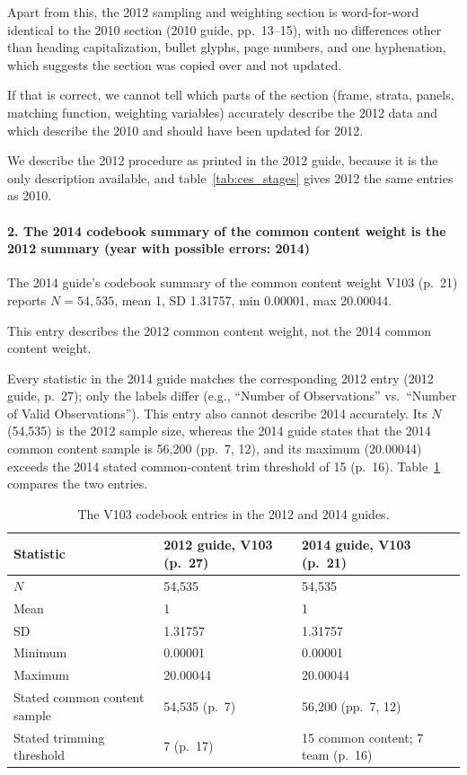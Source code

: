 \documentclass[12pt]{article}
\begin{document}

Apart from this, the 2012 sampling and weighting section is word-for-word identical to the 2010 section (2010 guide, pp.~13--15), with no differences other than heading capitalization, bullet glyphs, page numbers, and one hyphenation, which suggests the section was copied over and not updated.

If that is correct, we cannot tell which parts of the section (frame, strata, panels, matching function, weighting variables) accurately describe the 2012 data and which describe the 2010 and should have been updated for 2012.

We describe the 2012 procedure as printed in the 2012 guide, because it is the only description available, and table~\ref{tab:ces_stages} gives 2012 the same entries as 2010.

\paragraph*{2. The 2014 codebook summary of the common content weight is the 2012 summary (year with possible errors: 2014)}
The 2014 guide's codebook summary of the common content weight V103 (p.~21) reports $N = 54{,}535$, mean 1, SD 1.31757, min 0.00001, max 20.00044.

This entry describes the 2012 common content weight, not the 2014 common content weight.

Every statistic in the 2014 guide matches the corresponding 2012 entry (2012 guide, p.~27); only the labels differ (e.g., ``Number of Observations'' vs.\ ``Number of Valid Observations''). This entry also cannot describe 2014 accurately. Its $N$ (54,535) is the 2012 sample size, whereas the 2014 guide states that the 2014 common content sample is 56,200 (pp.~7, 12), and its maximum (20.00044) exceeds the 2014 stated common-content trim threshold of 15 (p.~16). Table~\ref{tab:guide_v103_2012_2014} compares the two entries.

\begin{table}[!htbp]
\centering
\footnotesize
\begin{threeparttable}
\caption{The V103 codebook entries in the 2012 and 2014 guides.}
\label{tab:guide_v103_2012_2014}
\begin{tabular}{lll}
\toprule
Statistic & 2012 guide, V103 (p.~27) & 2014 guide, V103 (p.~21) \\
\midrule
$N$ & 54,535 & 54,535 \\
Mean & 1 & 1 \\
SD & 1.31757 & 1.31757 \\
Minimum & 0.00001 & 0.00001 \\
Maximum & 20.00044 & 20.00044 \\
Stated common content sample & 54,535 (p.~7) & 56,200 (pp.~7, 12) \\
Stated trimming threshold & 7 (p.~17) & 15 common content; 7 team (p.~16) \\
\bottomrule
\end{tabular}
\end{threeparttable}
\end{table}
\end{document}
